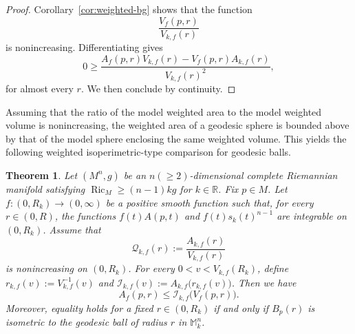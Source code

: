 \documentclass[11pt]{article}
\newtheorem{theorem}{Theorem}[section]
\newcommand{\Ric}{\operatorname{Ric}}
\begin{document}
\begin{proof}
Corollary~\ref{cor:weighted-bg} shows that the function
$$
\frac{V_f(p,r)}
{V_{k,f}(r)}
$$
is nonincreasing. Differentiating gives
$$
0
\geq
\frac{
A_f(p,r)V_{k,f}(r)
-
V_f(p,r)A_{k,f}(r)
}{
V_{k,f}(r)^2
},
$$
for almost every $r$. We then conclude by continuity.
\end{proof}






Assuming that the ratio of the model weighted area to the model weighted volume is nonincreasing, the weighted area of a geodesic sphere is bounded above by that of the model sphere enclosing the same weighted volume. This yields the following weighted isoperimetric-type comparison for geodesic balls.
\begin{theorem} \label{thm:weighted-isoperimetric}
Let $(M^n,g)$ be an $n(\geq 2)$-dimensional complete Riemannian manifold satisfying $\Ric_M\geq(n-1)kg$ for $k \in \mathbb{R}$. Fix \(p\in M\). Let $f\colon(0,R_k)\rightarrow(0,\infty)$ be a positive smooth function such that, for every
\(r\in(0,R)\), the functions $f(t)A(p,t)$ and $f(t)s_k(t)^{n-1}$ are integrable on \((0,R_k)\). Assume that
\[
\mathcal{Q}_{k,f}(r)
:=
\frac{A_{k,f}(r)}
{V_{k,f}(r)}
\]
is nonincreasing on \((0,R_k)\). For every $0<v<V_{k,f}(R_k)$, define $r_{k,f}(v):=V_{k,f}^{-1}(v)$ and $\mathcal{I}_{k,f}(v):= A_{k,f}\bigl(r_{k,f}(v)\bigr)$. Then we have
\[
A_f(p,r)
\leq
\mathcal{I}_{k,f}
\bigl(V_f(p,r)\bigr).
\]
Moreover, equality holds  for a fixed $r\in(0,R_k)$ if and only if $B_p(r)$ is isometric to the geodesic ball of radius $r$ in $\mathbb{M}_k^n$.
\end{theorem}
\end{document}
